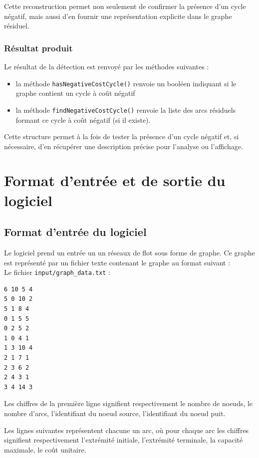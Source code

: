 \documentclass[titlepage]{article}
\begin{document}
Cette reconstruction permet non seulement de confirmer la présence d'un cycle négatif, mais aussi d'en fournir une représentation explicite dans le graphe résiduel.

\subsubsection{Résultat produit}

Le résultat de la détection est renvoyé par les méthodes suivantes :
\begin{itemize}
    \item la méthode \texttt{hasNegativeCostCycle()} renvoie un booléen indiquant si le graphe contient un cycle à coût négatif
    \item la méthode \texttt{findNegativeCostCycle()} renvoie la liste des arcs résiduels formant ce cycle à coût négatif (si il existe).
\end{itemize}

Cette structure permet à la fois de tester la présence d'un cycle négatif et, si nécessaire, d'en récupérer une description précise pour l'analyse ou l'affichage.


\clearpage


\section{Format d'entrée et de sortie du logiciel}

\subsection{Format d'entrée du logiciel}
\label{formatentree}

Le logiciel prend un entrée un un réseaux de flot sous forme de graphe. Ce graphe est représenté par un fichier texte contenant le graphe au format suivant :\\
Le fichier \texttt{input/graph\_data.txt} :

\begin{verbatim}
6 10 5 4
5 0 10 2
5 1 8 4
0 1 5 5
0 2 5 2
1 0 4 1
1 3 10 4
2 1 7 1
2 3 6 2
2 4 3 1
3 4 14 3
\end{verbatim}

Les chiffres de la première ligne signifient respectivement le nombre de noeuds, le nombre d'arcs, l'identifiant du noeud source, l'identifiant du noeud puit.

Les lignes suivantes représentent chacune un arc, où pour chaque arc les chiffres signifient respectivement l'extrémité initiale, l'extrémité terminale, la capacité maximale, le coût unitaire.
\end{document}
